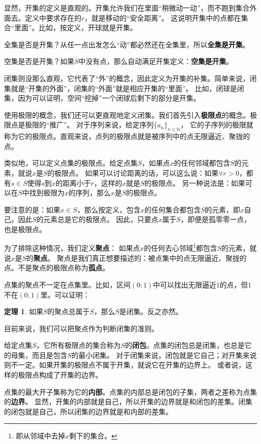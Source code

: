 \documentclass[12pt,UTF8]{ctexbook}
\theoremstyle{definition}
\newtheorem{tm}{定理}[section]
\theoremstyle{plain}
\begin{document}
显然，开集的定义是直观的。开集允许我们在里面“稍微动一动”，而不跑到集合外面去。定义中要求存在的$r$，就是移动的“安全距离”。
这说明开集中的点都在集合“里面”。比如，按定义，开球就是开集。

全集是否是开集？从任一点出发怎么“动”都必然还在全集里，所以\textbf{全集是开集}。

空集是否是开集？如果$S$中没有点，那么自动满足开集定义：\textbf{空集是开集}。

闭集则没那么直观，它代表了“外”的概念，因此定义为开集的补集。简单来说，闭集就是“开集的外面”，闭集的“外面”就是相应开集的“里面”。
比如，闭球是闭集，因为可以证明，空间“挖掉”一个闭球后剩下的部分是开集。

使用极限的概念，我们还可以更直观地定义闭集。我们首先引入\textbf{极限点}的概念。极限点是极限的“推广”。
对于序列来说，给定序列$\{a_n\}_{n\in\mathbb{N}}$，
它的子序列的极限就称为它的极限点。直观来说，点列的极限点就是被序列中的点无限逼近、聚拢的点。

类似地，可以定义点集的极限点。给定点集$S$，如果点$x$的任何邻域都包含$S$的元素，就说$x$是$S$的极限点。
如果可以讨论距离的话，可以这么说：如果$\forall r>0$，都有$s\in S$使得$s$到$x$的距离小于$r$，这样的$x$就是$S$的极限点。
另一种说法是：如果可以在$S$中找到极限为$x$的序列，那么$x$是$S$的极限点。

要注意的是：如果$x\in S$，那么按定义，包含$x$的任何集合都包含$S$的元素，即$x$自己。因此$S$的元素总是它的极限点。
因此，只要点$x$属于$S$，即便是孤零零一点，也是极限点。

为了排除这种情况，我们定义\textbf{聚点}：
如果点$x$的任何去心邻域\footnote{即从邻域中去掉$x$剩下的集合。}都包含$S$的元素，就说$x$是$S$的\textbf{聚点}。
聚点是我们真正想要描述的：被点集中的点无限逼近、聚拢的点。不是聚点的极限点称为\textbf{孤点}。

点集的聚点不一定在点集里。比如，区间$(0;1)$中可以找出无限逼近$1$的点，但$1$不在$(0;1)$里。可以证明：
\begin{tm}
    如果$S$的聚点总属于$S$，那么$S$是闭集。反之亦然。
\end{tm}

目前来说，我们可以把聚点作为判断闭集的准则。

给定点集$S$，它所有极限点的集合称为$S$的\textbf{闭包}。点集的闭包总是闭集，也总是它的母集，而且是包含$S$的最小闭集。
对于闭集来说，闭包就是它自己；对开集来说则不一定。如果开集的极限点不属于开集，就说它在开集的边界上。
或者说，这样的极限点构成了开集的边界。

点集的最大开子集称为它的\textbf{内部}。点集的内部总是闭包的子集，两者之差称为点集的\textbf{边界}。
显然，开集的内部就是自己，所以开集的边界就是和闭包的差集。闭集的闭包就是自己，所以闭集的边界就是和内部的差集。
\end{document}
